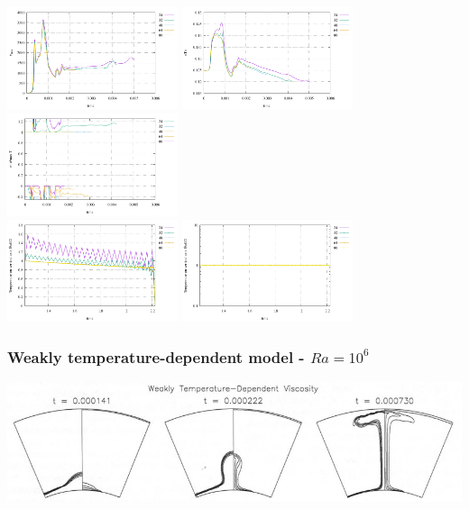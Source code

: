 \begin{center}
\includegraphics[width=5cm]{python_codes/fieldstone_106/results/axi/vrms1}
\includegraphics[width=5cm]{python_codes/fieldstone_106/results/axi/Tavrg1}
\includegraphics[width=5cm]{python_codes/fieldstone_106/results/axi/stats_T1}\\
\includegraphics[width=5cm]{python_codes/fieldstone_106/results/axi/profile_T1}
\includegraphics[width=5cm]{python_codes/fieldstone_106/results/axi/profile_eta1}
\end{center}




\newpage
\subsubsection*{Weakly temperature-dependent model - $Ra=10^6$}
\begin{center}
\includegraphics[width=15cm]{python_codes/fieldstone_106/images/keki97c}
\end{center}

